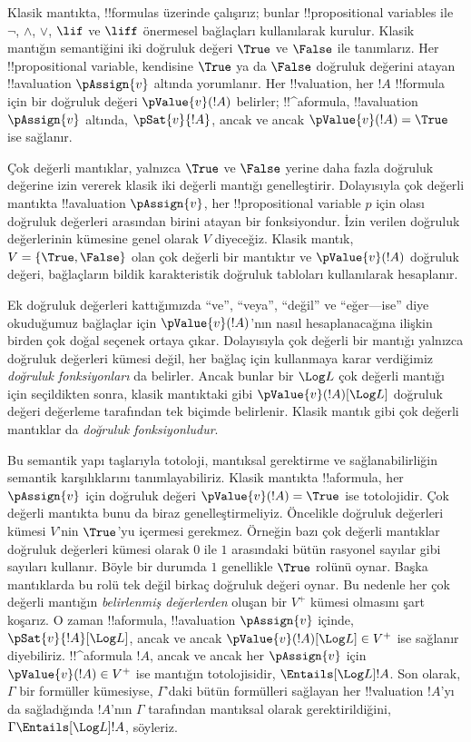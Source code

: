\documentclass[../../../include/open-logic-section]{subfiles}
\begin{document}


Klasik mantıkta, !!{formula}s üzerinde çalışırız; bunlar
!!{propositional variable}s ile $\lnot$, $\land$, $\lor$, $\lif$ ve $\liff$
önermesel bağlaçları kullanılarak kurulur. Klasik mantığın semantiğini iki
doğruluk değeri $\True$ ve $\False$ ile tanımlarız. Her
!!{propositional variable}, kendisine $\True$ ya da $\False$ doğruluk
değerini atayan !!a{valuation} $\pAssign{v}$ altında yorumlanır. Her
!!{valuation}, her $!A$ !!{formula} için bir doğruluk değeri
$\pValue{v}(!A)$ belirler; !!^a{formula}, !!a{valuation} $\pAssign{v}$
altında, $\pSat{v}{!A}$, ancak ve ancak $\pValue{v}(!A)=\True$ ise sağlanır.

Çok değerli mantıklar, yalnızca $\True$ ve $\False$ yerine daha fazla
doğruluk değerine izin vererek klasik iki değerli mantığı genelleştirir.
Dolayısıyla çok değerli mantıkta !!a{valuation} $\pAssign{v}$, her
!!{propositional variable} $p$ için olası doğruluk değerleri arasından birini
atayan bir fonksiyondur. İzin verilen doğruluk değerlerinin kümesine genel
olarak $V$ diyeceğiz. Klasik mantık, $V=\{\True,\False\}$ olan çok değerli
bir mantıktır ve $\pValue{v}(!A)$ doğruluk değeri, bağlaçların bildik
karakteristik doğruluk tabloları kullanılarak hesaplanır.

Ek doğruluk değerleri kattığımızda ``ve'', ``veya'', ``değil'' ve
``eğer---ise'' diye okuduğumuz bağlaçlar için $\pValue{v}(!A)$'nın nasıl
hesaplanacağına ilişkin birden çok doğal seçenek ortaya çıkar. Dolayısıyla
çok değerli bir mantığı yalnızca doğruluk değerleri kümesi değil, her bağlaç
için kullanmaya karar verdiğimiz \emph{doğruluk fonksiyonları} da belirler.
Ancak bunlar bir $\Log L$ çok değerli mantığı için seçildikten sonra,
klasik mantıktaki gibi $\pValue{v}(!A)[\Log L]$ doğruluk değeri değerleme
tarafından tek biçimde belirlenir. Klasik mantık gibi çok değerli mantıklar
da \emph{doğruluk fonksiyonludur}.

Bu semantik yapı taşlarıyla totoloji, mantıksal gerektirme ve
sağlanabilirliğin semantik karşılıklarını tanımlayabiliriz. Klasik mantıkta
!!a{formula}, her $\pAssign{v}$ için doğruluk değeri
$\pValue{v}(!A)=\True$ ise totolojidir. Çok değerli mantıkta bunu da biraz
genelleştirmeliyiz. Öncelikle doğruluk değerleri kümesi $V$'nin $\True$'yu
içermesi gerekmez. Örneğin bazı çok değerli mantıklar doğruluk değerleri
kümesi olarak $0$ ile $1$ arasındaki bütün rasyonel sayılar gibi sayıları
kullanır. Böyle bir durumda $1$ genellikle $\True$ rolünü oynar. Başka
mantıklarda bu rolü tek değil birkaç doğruluk değeri oynar. Bu nedenle her
çok değerli mantığın \emph{belirlenmiş değerlerden} oluşan bir $V^+$ kümesi
olmasını şart koşarız. O zaman !!a{formula}, !!a{valuation}
$\pAssign{v}$ içinde, $\pSat{v}{!A}[\Log L]$, ancak ve ancak
$\pValue{v}(!A)[\Log L]\in V^+$ ise sağlanır diyebiliriz. !!^a{formula}
$!A$, ancak ve ancak her $\pAssign{v}$ için $\pValue{v}(!A)\in V^+$ ise
  mantığın totolojisidir, $\Entails[\Log L] !A$. Son olarak, $\Gamma$ bir
  formüller kümesiyse, $\Gamma$'daki bütün formülleri sağlayan her
  !!{valuation} $!A$'yı da sağladığında $!A$'nın $\Gamma$ tarafından
  mantıksal olarak gerektirildiğini, $\Gamma\Entails[\Log L]!A$, söyleriz.
\end{document}
